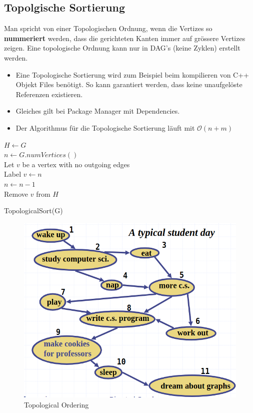 \subsection{Topolgische Sortierung}
Man spricht von einer Topologischen Ordnung, wenn die Vertizes so \textbf{nummeriert} werden, dass die gerichteten Kanten immer auf grössere Vertizes zeigen. Eine topologische Ordnung kann nur in DAG's (keine Zyklen) erstellt werden.  
\begin{itemize}
	\item Eine Topologische Sortierung wird zum Beispiel beim kompilieren von C++ Objekt Files benötigt. So kann garantiert werden, dass keine unaufgelöste Referenzen existieren.
	\item Gleiches gilt bei Package Manager mit Dependencies.
	\item Der Algorithmus für die Topologische Sortierung läuft mit $\mathcal{O}(n+m)$
\end{itemize}

\begin{algorithm}[H]
	$H \leftarrow G$ \\
	$n \leftarrow G.numVertices()$ \\
	{
		Let $v$ be a vertex with no outgoing edges \\
		Label $v \leftarrow n$ \\
		$n \leftarrow n -1  $ \\
		Remove $v$ from $H$
	}
	\caption{TopologicalSort(G)}
\end{algorithm}

\begin{figure}[ht!]
	\centering
	\begin{minipage}[t]{0.7\textwidth}
		\centering
		\includegraphics[width=0.7\linewidth]{images/dag}
		\caption{Topological Ordering}
		\label{fig:topologicalordering}
	\end{minipage}
\end{figure}

